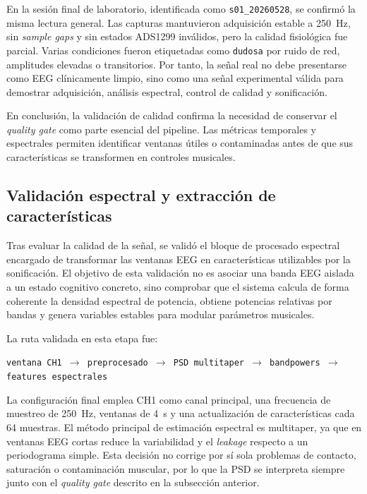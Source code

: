 \documentclass[../main.tex]{subfiles}
\begin{document}
En la sesión final de laboratorio, identificada como \texttt{s01\_20260528}, se confirmó la misma lectura general. Las capturas mantuvieron adquisición estable a \SI{250}{\hertz}, sin \textit{sample gaps} y sin estados ADS1299 inválidos, pero la calidad fisiológica fue parcial. Varias condiciones fueron etiquetadas como \texttt{dudosa} por ruido de red, amplitudes elevadas o transitorios. Por tanto, la señal real no debe presentarse como EEG clínicamente limpio, sino como una señal experimental válida para demostrar adquisición, análisis espectral, control de calidad y sonificación.

En conclusión, la validación de calidad confirma la necesidad de conservar el \textit{quality gate} como parte esencial del pipeline. Las métricas temporales y espectrales permiten identificar ventanas útiles o contaminadas antes de que sus características se transformen en controles musicales.

\subsection{Validación espectral y extracción de características}
\label{subsec:validacion_espectral}

Tras evaluar la calidad de la señal, se validó el bloque de procesado espectral encargado de transformar las ventanas EEG en características utilizables por la sonificación. El objetivo de esta validación no es asociar una banda EEG aislada a un estado cognitivo concreto, sino comprobar que el sistema calcula de forma coherente la densidad espectral de potencia, obtiene potencias relativas por bandas y genera variables estables para modular parámetros musicales.

La ruta validada en esta etapa fue:

\begin{center}
\texttt{ventana CH1 $\rightarrow$ preprocesado $\rightarrow$ PSD multitaper $\rightarrow$ bandpowers $\rightarrow$ features espectrales}
\end{center}

La configuración final emplea CH1 como canal principal, una frecuencia de muestreo de \SI{250}{\hertz}, ventanas de \SI{4}{\second} y una actualización de características cada 64 muestras. El método principal de estimación espectral es multitaper, ya que en ventanas EEG cortas reduce la variabilidad y el \textit{leakage} respecto a un periodograma simple. Esta decisión no corrige por sí sola problemas de contacto, saturación o contaminación muscular, por lo que la PSD se interpreta siempre junto con el \textit{quality gate} descrito en la subsección anterior.
\end{document}
